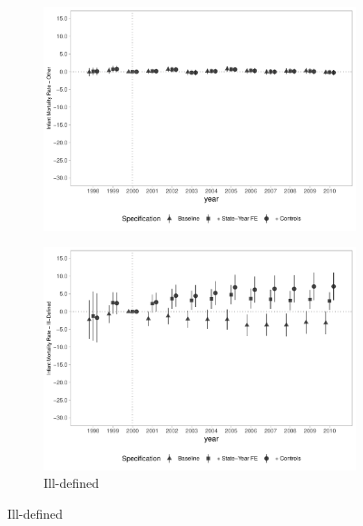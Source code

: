 \begin{figure}[h]
\begin{center}
\begin{subfigure}{0.32\textwidth}
        \includegraphics[width=\textwidth]{plots/IMR/tx_mi_out_dist_ec29_baseline_dist_ec29_baseline_full.pdf}
    \end{subfigure}
        \begin{subfigure}{0.32\textwidth}
        \centering
        \caption{\scriptsize Ill-defined}\label{fig:imr3_h}
        \includegraphics[width=\textwidth]{plots/IMR/tx_mi_illdef_dist_ec29_baseline_dist_ec29_baseline_full.pdf}
    \end{subfigure}
    \end{center}
    
\end{figure}



